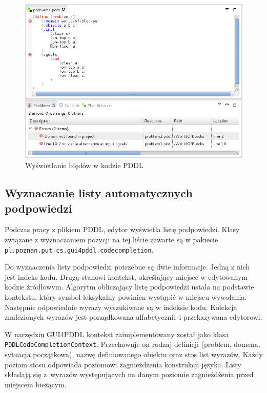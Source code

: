 \begin{figure}[h]
  \centering
    \includegraphics[scale=0.5]{img/ana_markers.png}
    \caption{Wyświetlanie błędów w kodzie PDDL}
    \label{ana_markers}
\end{figure}


\subsection{Wyznaczanie listy automatycznych podpowiedzi}
\begin{sloppypar}
Podczas pracy z plikiem PDDL, edytor wyświetla listę podpowiedzi. Klasy związane z wyznaczaniem
pozycji na tej liście zawarte są w pakiecie \texttt{pl.poznan.put.cs.gui4pddl.codecompletion}.
\end{sloppypar}

Do wyznaczenia listy podpowiedzi potrzebne są dwie informacje. Jedną z nich jest indeks kodu.
Drugą stanowi kontekst, określający miejsce w edytowanym kodzie źródłowym. Algorytm obliczający 
listę podpowiedzi ustala na podstawie kontekstu, który symbol leksykalny powinien wystąpić w miejscu 
wywołania. Następnie odpowiednie wyrazy wyszukiwane są w indeksie kodu. Kolekcja znalezionych 
wyrazów jest porządkowana alfabetycznie i przekazywana edytorowi.

\begin{sloppypar}
W narzędziu GUI4PDDL kontekst zaimplementowany został jako klasa \texttt{PDDLCodeCompletionContext}.
Przechowuje on rodzaj definicji (problem, domena,
sytuacja początkowa), nazwę definiowanego obiektu oraz stos list wyrazów. Każdy poziom stosu odpowiada
poziomowi zagnieżdżenia konstrukcji języka. Listy składają się z~wyrazów występujących na danym poziomie
zagnieżdżenia przed miejscem bieżącym.
\end{sloppypar}


